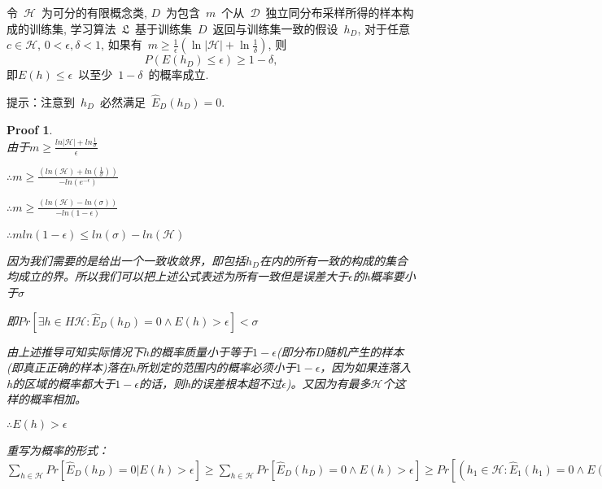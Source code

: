 \documentclass[a4paper,UTF8]{article}
\numberwithin{equation}{section}
\newtheorem*{myProof}{Proof}
\begin{document}
令~$\mathcal{H}$~为可分的有限概念类, $D$~为包含~$m$~个从~$\mathcal{D}$~独立同分布采样所得的样本构成的训练集, 学习算法~$\mathfrak{L}$~基于训练集~$D$~返回与训练集一致的假设~$h_D$, 对于任意~$c\in \mathcal{H}$, $0<\epsilon, \delta < 1$, 如果有~$m \geq \frac{1}{\epsilon}(\ln|\mathcal{H}|+\ln\frac{1}{\delta})$, 则
\begin{equation}
	P\left(E(h_D)\leq\epsilon\right)\geq 1-\delta,
\end{equation}
即$E(h)\leq\epsilon$~以至少~$1-\delta$~的概率成立.

\noindent 提示：注意到~$h_D$~必然满足~$\widehat{E}_D(h_D) = 0$.

\begin{myProof}~\\
	由于$m\geq \frac{ln\left| \mathcal{H}\right|+ln\frac{1}{\sigma }}{\epsilon }$
	
	$\therefore m\geq \frac{\left ( ln\left ( \mathcal{H} \right )+ln\left ( \frac{1}{\sigma } \right ) \right )}{-ln\left ( e^{-\epsilon } \right )}$
	
	$\therefore m\geq \frac{\left ( ln\left ( \mathcal{H} \right )-ln\left ( \sigma  \right ) \right )}{-ln\left (1-\epsilon  \right )}
	$
	
	$\therefore mln\left ( 1-\epsilon  \right )\leq ln\left ( \sigma  \right )-ln\left ( \mathcal{H} \right )$
	
	因为我们需要的是给出一个一致收敛界，即包括$h_D$在内的所有一致的构成的集合均成立的界。所以我们可以把上述公式表述为所有一致但是误差大于$\epsilon$的h概率要小于$\sigma$
	
	即$Pr[\exists h\in H\mathcal{H}: \widehat{E}_D(h_D) = 0\wedge E\left ( h \right )>\epsilon ]<\sigma $
	
	由上述推导可知实际情况下$h$的概率质量小于等于$1-\epsilon$(即分布D随机产生的样本(即真正正确的样本)落在$h$所划定的范围内的概率必须小于$1-\epsilon$，因为如果连落入h的区域的概率都大于$1-\epsilon$的话，则h的误差根本超不过$\epsilon$)。又因为有最多$\mathcal{H}$个这样的概率相加。
	
	$\therefore E\left ( h \right )>\epsilon $
	
	重写为概率的形式：
	$\sum_{h\in \mathcal{H}}^{}Pr\left [ \widehat{E}_D(h_D) = 0 |E\left ( h \right )>\epsilon \right ]\geq \sum_{h\in \mathcal{H}}^{}Pr\left [\widehat{E}_D(h_D) = 0 \wedge E\left ( h \right )>\epsilon  \right ]\geq Pr\left [ \left ( h_{1}\in\mathcal{H}:  \widehat{E}_1(h_1) = 0 \wedge E\left ( h_1 \right )>\epsilon \right ) \vee \left ( h_{2}\in\mathcal{H}:  \widehat{E}_2(h_2) = 0 \wedge E\left ( h_2 \right )>\epsilon \right )\vee ...\right ]$
	

\end{myProof}
\end{document}
